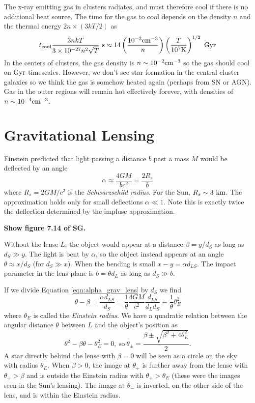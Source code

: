 \documentclass[]{article}
\begin{document}
The x-ray emitting gas in clusters radiates, and must
therefore cool if there is no additional 
heat source.  The time for the gas to cool 
depends on the density $n$ and the thermal
energy $2n \times (3kT/2)$ as
\begin{equation}
t_{\mathrm{cool}} \frac{3nkT}{3\times 10^{-27}n^2\sqrt{T}}~\mathrm{s}\approx 14\left(\frac{10^{-3}\mathrm{cm}^{-3}}{n}\right)\left(\frac{T}{10^{7}\mathrm{K}}\right)^{1/2}~\mathrm{Gyr}
\end{equation}
\noindent
In the centers of clusters, the gas density is $n\sim10^{-2}\mathrm{cm}^{-3}$ so
the gas should cool on $\mathrm{Gyr}$ timescales.  However, we don't see star
formation in the central cluster galaxies so we think the gas is somehow
heated again (perhaps from SN or AGN).  Gas in the outer regions
will remain hot effectively forever, with densities of $n\sim10^{-4}\mathrm{cm}^{-3}$.

\section{Gravitational Lensing}

Einstein predicted that light passing a distance $b$
past a mass $M$ would be deflected by an angle
\begin{equation}
\label{eqn:alpha_grav_lens}
\alpha \approx \frac{4GM}{bc^2} = \frac{2R_s}{b}
\end{equation}
\noindent
where $R_s = 2 GM/c^2$ is the {\it Schwarzschild radius}.
For the Sun, $R_s\sim3~\mathrm{km}$. The approximation
holds only for small deflections $\alpha\ll1$.
Note this is exactly twice the deflection determined by 
the impluse approximation.

{\bf Show figure 7.14 of SG.}

Without the lense $L$, the object would appear at a distance
$\beta = y/d_{S}$ as long as $d_{S} \gg y$.
The light is bent by $\alpha$, so the object instead appears
at an angle $\theta \approx x/d_S$ (for $d_S \gg x$).
When the bending is small $x-y = \alpha d_{LS}$.
The impact parameter in the lens plane is $b = \theta d_{L}$
as long as $d_S \gg b$.

If we divide Equation \ref{eqn:alpha_grav_lens} by $d_S$
we find
\begin{equation}
\theta - \beta = \frac{\alpha d_{LS}}{d_S} = \frac{1}{\theta} \frac{4 GM}{c^2} \frac{d_{LS}}{d_L d_S} \equiv \frac{1}{\theta} \theta_E^2
\end{equation}
\noindent
where $\theta_E$ is called the {\it Einstein radius}.
We have a quadratic relation between the angular distance $\theta$ between
$L$ and the object's position as
\begin{equation}
\theta^2 - \beta \theta - \theta_E^2 = 0,~\mathrm{so}~\theta_{\pm} = \frac{\beta \pm \sqrt{\beta^2 + 4 \theta_E^2}}{2}.
\end{equation}
\noindent
A star directly behind the lense with $\beta=0$ will be seen as a circle
on the sky with radius $\theta_E$.  When $\beta>0$, the image at $\theta_{+}$
is further away from the lense with $\theta_{+}>\beta$ and is outside
the Einstein radius with $\theta_{+}>\theta_E$ (these were the images
seen in the Sun's lensing).  The image at $\theta_{-}$ is inverted, on
the other side of the lens, and is within the Einstein radius.
\end{document}
